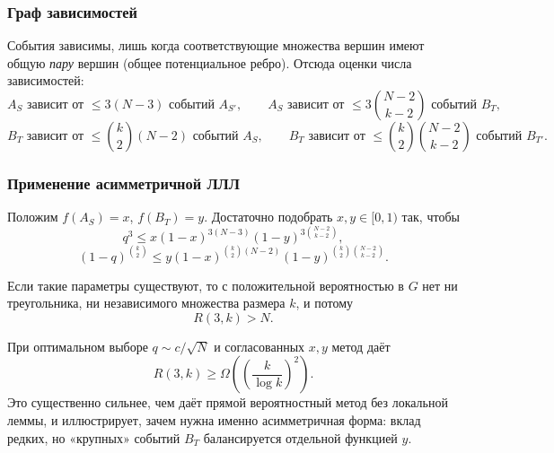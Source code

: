 \subsubsection*{Граф зависимостей}

События зависимы, лишь когда соответствующие множества вершин имеют общую \emph{пару} вершин (общее потенциальное ребро). Отсюда оценки числа зависимостей:
\[
A_S \text{ зависит от } \le 3(N-3) \text{ событий } A_{S'},
\qquad
A_S \text{ зависит от } \le 3\binom{N-2}{k-2} \text{ событий } B_T,
\]
\[
B_T \text{ зависит от } \le \binom{k}{2}(N-2) \text{ событий } A_S,
\qquad
B_T \text{ зависит от } \le \binom{k}{2}\binom{N-2}{k-2} \text{ событий } B_{T'}.
\]

\subsubsection*{Применение асимметричной ЛЛЛ}

Положим $f(A_S)=x$, $f(B_T)=y$. Достаточно подобрать $x,y\in[0,1)$ так, чтобы
\[
q^3\le x(1-x)^{3(N-3)}(1-y)^{3\binom{N-2}{k-2}},
\]
\[
(1-q)^{\binom{k}{2}}\le y(1-x)^{\binom{k}{2}(N-2)}(1-y)^{\binom{k}{2}\binom{N-2}{k-2}}.
\]

Если такие параметры существуют, то с положительной вероятностью в $G$ нет ни треугольника, ни независимого множества размера $k$, и потому
\[
R(3,k)>N.
\]

\begin{Remark}{}{}
	При оптимальном выборе $q\sim c/\sqrt{N}$ и согласованных $x,y$ метод даёт
	\[
	R(3,k)\ge\Omega\!\left(\left(\frac{k}{\log k}\right)^2\right).
	\]
	Это существенно сильнее, чем даёт прямой вероятностный метод без локальной леммы, и иллюстрирует, зачем нужна именно асимметричная форма: вклад редких, но «крупных» событий $B_T$ балансируется отдельной функцией $y$.
\end{Remark}
